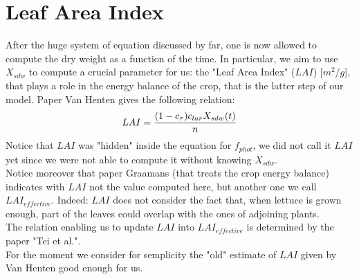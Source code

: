 \section{Leaf Area Index}
After the huge system of equation discussed by far, one is now allowed to compute the dry weight as a function of the time.
In particular, we aim to use $X_{sdw}$ to compute a crucial parameter for us: the "Leaf Area Index" ($LAI$) [$m^2/g$], that plays a role in the energy balance of the crop, that is the latter step of our model.
Paper Van Henten gives the following relation:
\begin{equation} \label{LAI}
	LAI = \frac{(1-c_\tau)c_{lar}X_{sdw}(t)}{n}\\
\end{equation}
Notice that $LAI$ was "hidden" inside the equation for $f_{phot}$, we did not call it $LAI$ yet since we were not able to compute it without knowing $X_{sdw}$.\\
Notice moreover that paper Graamans (that treats the crop energy balance) indicates with $LAI$ not the value computed here, but another one we call $LAI_{effective}$.
Indeed: $LAI$ does not consider the fact that, when lettuce is grown enough, part of the leaves could overlap with the ones of adjoining plants.\\
The relation enabling us to update $LAI$ into $LAI_{effective}$ is determined by the paper "Tei et al.".\\
For the moment we consider for semplicity the "old" estimate of $LAI$ given by Van Henten good enough for us. 	
